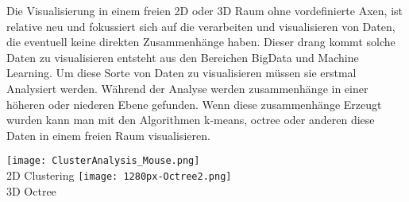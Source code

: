 \begin{itemize}
        Die Visualisierung in einem freien 2D oder 3D Raum ohne vordefinierte Axen, ist relative neu und fokussiert sich auf die verarbeiten
        und visualisieren von Daten, die eventuell keine direkten Zusammenhänge haben. Dieser drang kommt solche Daten zu visualisieren
        entsteht aus den Bereichen BigData und Machine Learning. Um diese Sorte von Daten zu visualisieren müssen
        sie erstmal Analysiert werden. Während der Analyse werden zusammenhänge in einer höheren oder niederen Ebene gefunden. Wenn diese zusammenhänge Erzeugt
        wurden kann man mit den Algorithmen k-means, octree oder anderen diese Daten in einem freien Raum visualisieren.
        \begin{center}
            \texttt{[image: ClusterAnalysis\_Mouse.png]}\cite{2dclustering}\\
            2D Clustering
            \texttt{[image: 1280px-Octree2.png]}\cite{wikioctree}\\
            3D Octree
        \end{center}
\end{itemize}


